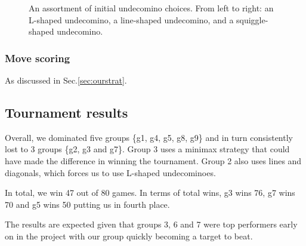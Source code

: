 \documentclass{scrartcl}
\begin{document}
\begin{figure}[h]
\centering
{}
\caption{An assortment of initial undecomino choices. From left to right: an L-shaped undecomino, a line-shaped undecomino, and a squiggle-shaped undecomino.}\label{fig:undecomino_selection}
\end{figure}

\subsubsection{Move scoring}
As discussed in Sec.\ref{sec:ourstrat}.

\subsection{Tournament results}

Overall, we dominated five groups \{g1, g4, g5, g8, g9\} and in turn consistently lost to 3 groups \{g2, g3 and g7\}. Group 3 uses a minimax strategy that could have made the difference in winning the tournament. Group 2 also uses lines and diagonals, which forces us to use L-shaped undecominoes.

In total, we win 47 out of 80 games. In terms of total wins, g3 wins 76, g7 wins 70 and g5 wins 50 putting us in fourth place.

The results are expected given that groups 3, 6 and 7 were top performers early on in the project with our group quickly becoming a target to beat.
\end{document}
